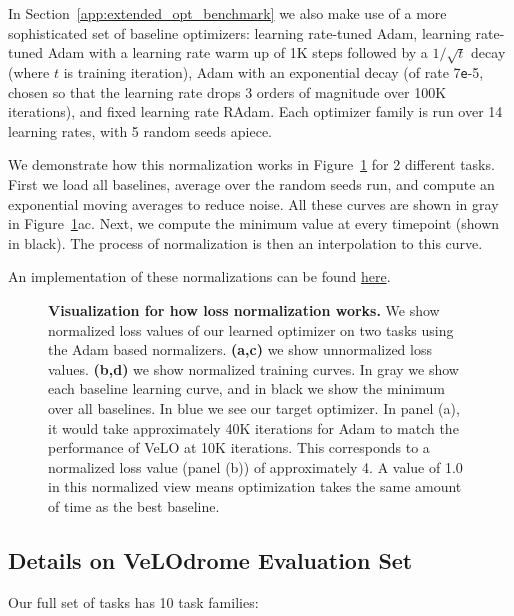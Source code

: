\documentclass[11pt]{article}
\newcommand{\e}{\texttt{e}}
\begin{document}
In Section~\ref{app:extended_opt_benchmark} we also make use of a more sophisticated set of baseline optimizers: learning rate-tuned Adam, learning rate-tuned Adam with a learning rate warm up of 1K steps followed by a $1/\sqrt{t}$ decay (where $t$ is training iteration), Adam with an exponential decay (of rate 7\e-5, chosen so that the learning rate drops 3 orders of magnitude over 100K iterations), and fixed learning rate RAdam. Each optimizer family is run over 14 learning rates, with 5 random seeds apiece.

We demonstrate how this normalization works in Figure~\ref{fig:normalize_vis} for 2 different tasks. First we load all baselines, average over the random seeds run, and compute an exponential moving averages to reduce noise.
All these curves are shown in gray in Figure~\ref{fig:normalize_vis}ac. Next, we compute the minimum value at every timepoint (shown in black). The process of normalization is then an interpolation to this curve.

An implementation of these normalizations can be found \href{https://github.com/google/learned_optimization/blob/main/learned_optimization/baselines/normalizers.py}{here}.

\begin{figure}
    \centering
    \vspace{-1em}
    \caption{\textbf{Visualization for how loss normalization works.} We show normalized loss values of our learned optimizer on two tasks using the Adam based normalizers. \textbf{(a,c)} we show unnormalized loss values. \textbf{(b,d)} we show normalized training curves. In gray we show each baseline learning curve, and in black we show the minimum over all baselines. In blue we see our target optimizer. In panel (a), it would take approximately 40K iterations for Adam to match the performance of VeLO at 10K iterations.
    This corresponds to a normalized loss value (panel (b)) of approximately 4.
    A value of 1.0 in this normalized view means optimization takes the same amount of time as the best baseline.
    \label{fig:normalize_vis}
    }
\end{figure}

\subsection{Details on VeLOdrome Evaluation Set}
Our full set of tasks has 10 task families:
\end{document}
